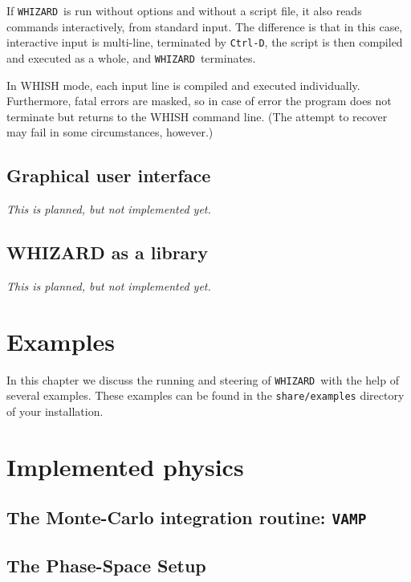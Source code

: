 \documentclass[12pt]{book}
\newcommand{\ttt}[1]{\texttt{#1}}
\newcommand{\whizard}{\texttt{WHIZARD}}
\begin{document}
If \whizard\ is run without options and without a script file, it
also reads commands interactively, from standard input.  The
difference is that in this case, interactive input is multi-line,
terminated by \ttt{Ctrl-D}, the script is then compiled and
executed as a whole, and \whizard\ terminates.

In WHISH mode, each input line is compiled and executed individually.
Furthermore, fatal errors are masked, so in case of error the program
does not terminate but returns to the WHISH command line.  (The
attempt to recover may fail in some circumstances, however.)


\section{Graphical user interface}

\emph{This is planned, but not implemented yet.}


\section{WHIZARD as a library}

\emph{This is planned, but not implemented yet.}


\chapter{Examples}

In this chapter we discuss the running and steering of \whizard\ with
the help of several examples. These examples can be found in the
\ttt{share/examples} directory of your installation.

\newpage

\chapter{Implemented physics}

\section{The Monte-Carlo integration routine: \ttt{VAMP}} 


\section{The Phase-Space Setup}
\end{document}
